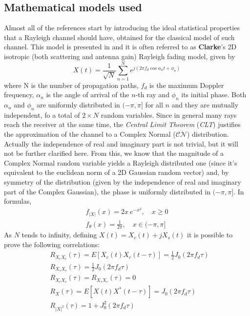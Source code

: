 \subsection{Mathematical models used} %
\label{subsec:math_models}

Almost all of the references start by introducing the ideal statistical properties that a Rayleigh channel should have, obtained for the classical model of such channel. This model is presented in \cite{clarke} and it is often referred to as \textbf{Clarke}'s 2D isotropic (both scattering and antenna gain) Rayleigh fading model, given by%
%
\begin{equation}
X(t) = \frac{1}{\sqrt{N}} \sum_{n=1}^{N} e^{j(2\pi f_d \cos \alpha_n t + \phi_n)}
\end{equation}%
%
where N is the number of propagation paths, $f_d$ is the maximum Doppler frequency, $\alpha_n$ is the angle of arrival of the $n$-th ray and $\phi_n$ its initial phase. Both $\alpha_n$ and $\phi_n$ are uniformly distributed in $(-\pi,\pi]$ for all $n$ and they are mutually independent, fo a total of $2 \times N$ random variables. Since in general many rays reach the receiver at the same time, the \textit{Central Limit Theorem} (\textit{CLT}) justifies the approximation of the channel to a Complex Normal ($\mathcal{CN}$) distribution. Actually the independence of real and imaginary part is not trivial, but it will not be further clarified here. From this, we know that the magnitude of a Complex Normal random variable yields a Rayleigh distributed one (since it's equivalent to the euclidean norm of a 2D Gaussian random vector) and, by symmetry of the distribution (given by the independence of real and imaginary part of the Complex Gaussian), the phase is uniformly distributed in $(-\pi,\pi]$. In formulas,%
%
\begin{subequations} \label{eqs:pdfs}
\begin{align}
	f_{|X|}(x) = 2x \ e^{-x^2}, \quad x \geq 0\\
	f_{\theta}(x) = \frac{1}{2\pi}, \quad x \in (-\pi,\pi]
\end{align}
\end{subequations}%
%
As $N$ tends to infinity, defining $X(t) = X_c(t) + jX_s(t)$ it is possible to prove the following correlations:%
%
\begin{subequations}
	\label{eqs:correlations}
\begin{align}
&R_{X_cX_c}(\tau) = E[X_c(t)X_c(t-\tau)] = \frac{1}{2} J_0(2\pi f_d\tau)\\
&R_{X_sX_s}(\tau) = \frac{1}{2} J_0(2\pi f_d\tau)\\
&R_{X_cX_s}(\tau) = R_{X_sX_c}(\tau) = 0\\
&R_X(\tau) = E[X(t) X^*(t-\tau)] = J_0(2\pi f_d \tau)\\
&R_{|X|^2}(\tau) = 1 + J_0^2(2\pi f_d \tau)
\end{align}
\end{subequations}%
